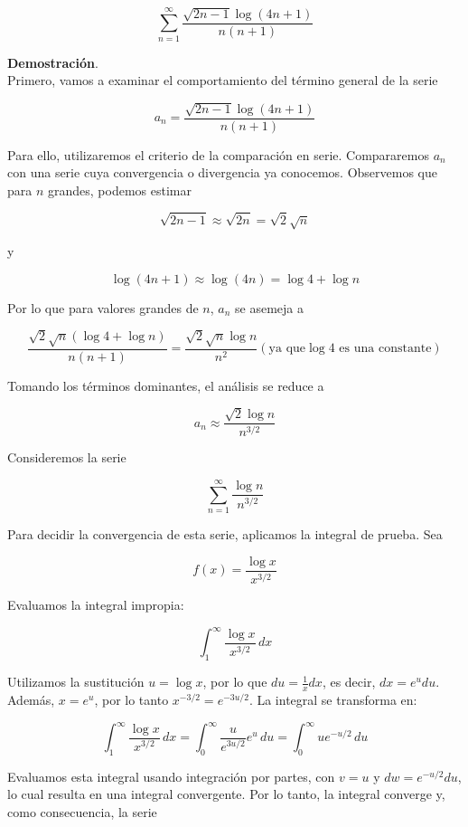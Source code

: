 \documentclass{article}
\begin{document}
    $$
    \sum_{n=1}^{\infty} \frac{\sqrt{2 n-1} \log (4 n+1)}{n(n+1)}
    $$

    \textbf{Demostración}.\\

    Primero, vamos a examinar el comportamiento del término general de la serie

    \[
    a_n = \frac{\sqrt{2 n-1} \log (4 n+1)}{n(n+1)}
    \]

    Para ello, utilizaremos el criterio de la comparación en serie. Compararemos $a_n$ con una serie cuya convergencia o divergencia ya conocemos. Observemos que para $n$ grandes, podemos estimar

    \[
    \sqrt{2n-1} \approx \sqrt{2n} = \sqrt{2}\sqrt{n}
    \]

    y

    \[
    \log(4n+1) \approx \log(4n) = \log 4 + \log n
    \]

    Por lo que para valores grandes de $n$, $a_n$ se asemeja a

    \[
    \frac{\sqrt{2} \sqrt{n} (\log 4 + \log n)}{n(n+1)} = \frac{\sqrt{2} \sqrt{n} \log n}{n^2} \left( \text{ya que} \log 4 \text{ es una constante}\right)
    \]

    Tomando los términos dominantes, el análisis se reduce a

    \[
    a_n \approx \frac{\sqrt{2} \log n}{n^{3/2}}
    \]

    Consideremos la serie

    \[
    \sum_{n=1}^{\infty} \frac{\log n}{n^{3/2}}
    \]

    Para decidir la convergencia de esta serie, aplicamos la integral de prueba. Sea

    \[
    f(x) = \frac{\log x}{x^{3/2}}
    \]

    Evaluamos la integral impropia:

    \[
    \int_1^\infty \frac{\log x}{x^{3/2}} \, dx
    \]

    Utilizamos la sustitución $u = \log x$, por lo que $du = \frac{1}{x} dx$, es decir, $dx = e^u du$. Además, $x = e^u$, por lo tanto $x^{-3/2} = e^{-3u/2}$. La integral se transforma en:

    \[
    \int_1^\infty \frac{\log x}{x^{3/2}} \, dx = \int_0^\infty \frac{u}{e^{3u/2}} e^u \, du = \int_0^\infty ue^{-u/2} \, du
    \]

    Evaluamos esta integral usando integración por partes, con $v = u$ y $dw = e^{-u/2} du$, lo cual resulta en una integral convergente. Por lo tanto, la integral converge y, como consecuencia, la serie
\end{document}
